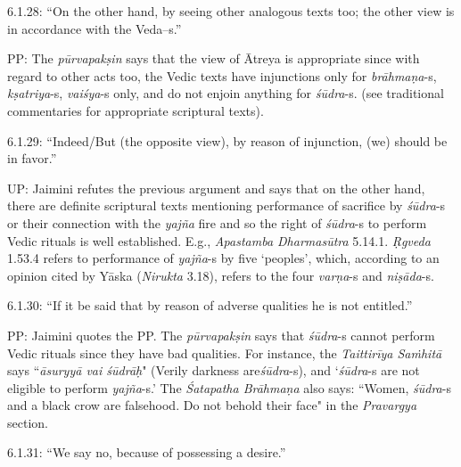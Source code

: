 \vspace{.1cm}

6.1.28: “On the other hand, by seeing other analogous texts too; the other view is in accordance with the Veda--s.”

\vspace{.1cm}

PP: The \textit{pūrvapakṣin} says that the view of Ātreya is appropriate since with regard to other acts too, the Vedic texts have injunctions only for \textit{brāhmaṇa}-s, \textit{kṣatriya}-s, \textit{vaiśya}-s only, and do not enjoin anything for \textit{śūdra}-s. (see traditional commentaries for appropriate scriptural texts).

6.1.29: “Indeed/But (the opposite view), by reason of injunction, (we) should be in favor.”

UP: Jaimini refutes the previous argument and says that on the other hand, there are definite scriptural texts mentioning performance of sacrifice by \textit{śūdra}-s or their connection with the \textit{yajña} fire and so the right of \textit{śūdra}-s to perform Vedic rituals is well established. E.g., \textit{Apastamba Dharmasūtra} 5.14.1. \textit{Ṛgveda} 1.53.4 refers to performance of \textit{yajña}-s by five ‘peoples’, which, according to an opinion cited by Yāska (\textit{Nirukta} 3.18), refers to the four \textit{varṇa}-s and \textit{niṣāda}-s.

6.1.30: “If it be said that by reason of adverse qualities he is not entitled.”

PP: Jaimini quotes the PP. The \textit{pūrvapakṣin} says that \textit{śūdra}-s cannot perform Vedic rituals since they have bad qualities. For instance, the \textit{Taittirīya Saṁhitā} says ``\textit{āsuryyā vai śūdrāḥ}" (Verily darkness are\break \textit{śūdra}-s), and ‘\textit{śūdra}-s are not eligible to perform \textit{yajña}-s.’ The \textit{Śatapatha Brāhmaṇa} also says: ``Women, \textit{śūdra}-s and a black crow are falsehood. Do not behold their face" in the \textit{Pravargya} section.

6.1.31: “We say no, because of possessing a desire.”

